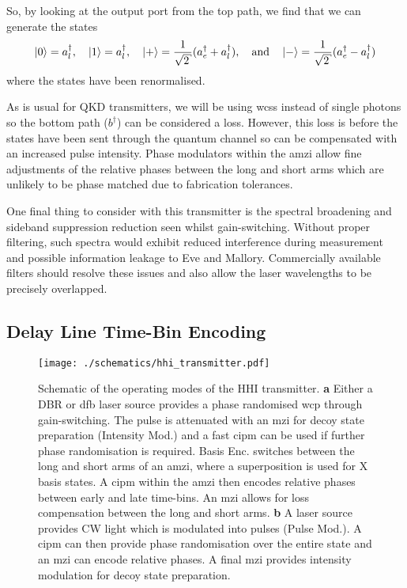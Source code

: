 So, by looking at the output port from the top path, we find that we can generate the states
\begin{align}
	\ket{0} = a^\dagger_l, \quad \ket{1} = a^\dagger_l, \quad \ket{+} = \frac{1}{\sqrt{2}}(a^\dagger_e + a^\dagger_l),  \quad \text{and} \quad \ket{-} = \frac{1}{\sqrt{2}}(a^\dagger_e - a^\dagger_l)
\end{align}
where the states have been renormalised. 

As is usual for \ac{QKD} transmitters, we will be using \acp{wcs} instead of single photons so the bottom path ($b^\dagger$) can be considered a loss. However, this loss is before the states have been sent through the quantum channel so can be compensated with an increased pulse intensity. Phase modulators within the \ac{amzi} allow fine adjustments of the relative phases between the long and short arms which are unlikely to be phase matched due to fabrication tolerances. 

One final thing to consider with this transmitter is the spectral broadening and sideband suppression reduction seen whilst gain-switching. Without proper filtering, such spectra would exhibit reduced interference during measurement and possible information leakage to Eve and Mallory. Commercially available filters should resolve these issues and also allow the laser wavelengths to be precisely overlapped.

\subsection{Delay Line Time-Bin Encoding}

\begin{sidewaysfigure}
	\centering
	\texttt{[image: ./schematics/hhi\_transmitter.pdf]}
	\caption[Schematic of the HHI full transmitter]{Schematic of the operating modes of the HHI transmitter. \textbf{a} Either a \ac{DBR} or \ac{dfb} laser source provides a phase randomised \ac{wcp} through gain-switching. The pulse is attenuated with an \ac{mzi} for decoy state preparation (Intensity Mod.) and a fast \ac{cipm} can be used if further phase randomisation is required. Basis Enc. switches between the long and short arms of an \ac{amzi}, where a superposition is used for X basis states. A \ac{cipm} within the \ac{amzi} then encodes relative phases between early and late time-bins. An \ac{mzi} allows for loss compensation between the long and short arms. \textbf{b} A laser source provides \ac{CW} light which is modulated into pulses (Pulse Mod.). A \ac{cipm} can then provide phase randomisation over the entire state and an \ac{mzi} can encode relative phases. A final \ac{mzi} provides intensity modulation for decoy state preparation.}
	\label{fig:hhi_transmitter}
\end{sidewaysfigure}

